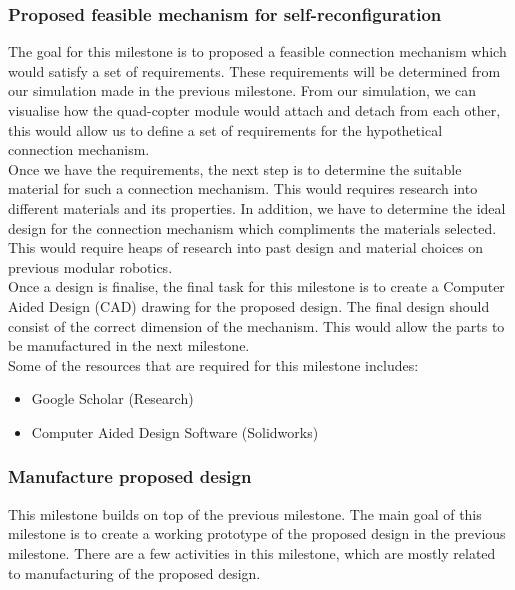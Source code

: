 \documentclass[12pt,A4]{article}
\begin{document}
	\subsubsection{Proposed feasible mechanism for self-reconfiguration}
	
	The goal for this milestone is to proposed a feasible connection mechanism which would satisfy a set of requirements. These requirements will be determined from our simulation made in the previous milestone. From our simulation, we can visualise how the quad-copter module would attach and detach from each other, this would allow us to define a set of requirements for the hypothetical connection mechanism.\\
	
	Once we have the requirements, the next step is to determine the suitable material for such a connection mechanism. This would requires research into different materials and its properties. In addition, we have to determine the ideal design for the connection mechanism which compliments the materials selected. This would require heaps of research into past design and material choices on previous modular robotics.\\
	
	Once a design is finalise, the final task for this milestone is to create a Computer Aided Design (CAD) drawing for the proposed design. The final design should consist of the correct dimension of the mechanism. This would allow the parts to be manufactured in the next milestone.\\
	
	Some of the resources that are required for this milestone includes:
	\begin{itemize}
		\item Google Scholar (Research)
		\item Computer Aided Design Software (Solidworks)
	\end{itemize}
	
	\subsubsection{Manufacture proposed design}
	
	This milestone builds on top of the previous milestone. The main goal of this milestone is to create a working prototype of the proposed design in the previous milestone. There are a few activities in this milestone, which are mostly related to manufacturing of the proposed design.\\
	
\end{document}
